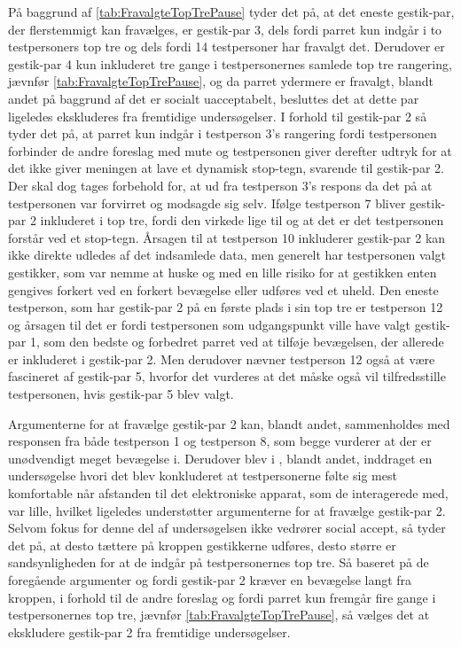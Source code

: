 På baggrund af \autoref{tab:FravalgteTopTrePause} tyder det på, at det eneste gestik-par, der flerstemmigt kan fravælges, er gestik-par 3, dels fordi parret kun indgår i to testpersoners top tre og dels fordi 14 testpersoner har fravalgt det. Derudover er gestik-par 4 kun inkluderet tre gange i testpersonernes samlede top tre rangering, jævnfør \autoref{tab:FravalgteTopTrePause}, og da parret ydermere er fravalgt, blandt andet på baggrund af det er socialt uacceptabelt, besluttes det at dette par ligeledes ekskluderes fra fremtidige undersøgelser. I forhold til gestik-par 2 så tyder det på, at parret kun indgår i testperson 3's rangering fordi testpersonen forbinder de andre foreslag med mute og testpersonen giver derefter udtryk for at det ikke giver meningen at lave et dynamisk stop-tegn, svarende til gestik-par 2. Der skal dog tages forbehold for, at ud fra testperson 3's respons da det på at testpersonen var forvirret og modsagde sig selv. Ifølge testperson 7 bliver gestik-par 2 inkluderet i top tre, fordi den virkede lige til og at det er det testpersonen forstår ved et stop-tegn. Årsagen til at testperson 10 inkluderer gestik-par 2 kan ikke direkte udledes af det indsamlede data, men generelt har testpersonen valgt gestikker, som var nemme at huske og med en lille risiko for at gestikken enten gengives forkert ved en forkert bevægelse eller udføres ved et uheld. Den eneste testperson, som har gestik-par 2 på en første plads i sin top tre er testperson 12 og årsagen til det er fordi testpersonen som udgangspunkt ville have valgt gestik-par 1, som den bedste og forbedret parret ved at tilføje bevægelsen, der allerede er inkluderet i gestik-par 2. Men derudover nævner testperson 12 også at være fascineret af gestik-par 5, hvorfor det vurderes at det måske også vil tilfredsstille testpersonen, hvis gestik-par 5 blev valgt. 

Argumenterne for at fravælge gestik-par 2 kan, blandt andet, sammenholdes med responsen fra både testperson 1 og testperson 8, som begge vurderer at der er unødvendigt meget bevægelse i. Derudover blev i , blandt andet, inddraget en undersøgelse hvori det blev konkluderet at testpersonerne følte sig mest komfortable når afstanden til det elektroniske apparat, som de interagerede med, var lille, hvilket ligeledes understøtter argumenterne for at fravælge gestik-par 2. Selvom fokus for denne del af undersøgelsen ikke vedrører social accept, så tyder det på, at desto tættere på kroppen gestikkerne udføres, desto større er sandsynligheden for at de indgår på testpersonernes top tre. Så baseret på de foregående argumenter og fordi gestik-par 2 kræver en bevægelse langt fra kroppen, i forhold til de andre foreslag og fordi parret kun fremgår fire gange i testpersonernes top tre, jævnfør \autoref{tab:FravalgteTopTrePause}, så vælges det at ekskludere gestik-par 2 fra fremtidige undersøgelser.  
